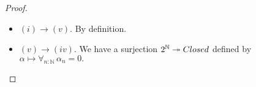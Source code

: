 \begin{proof}
\begin{itemize}
%     
%
%
%
%
%
%
%
%
%
%
%
%
   \item $(i) \to (v)$. By definition.
   \item $(v) \to (iv)$.
     We have a surjection $2^\N\twoheadrightarrow\Closed$ defined by $\alpha \mapsto \forall_{n:\mathbb N}\, \alpha_n = 0.$

\end{itemize}
\end{proof}
